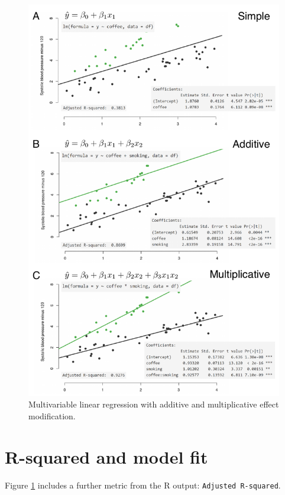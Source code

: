 \documentclass[12pt,]{krantz}
\theoremstyle{definition}
\theoremstyle{definition}
\theoremstyle{definition}
\theoremstyle{remark}
\begin{document}
\begin{figure}
\centering
\includegraphics{images/chapter07/6_types.pdf}
\caption{\label{fig:chap07-fig-types}Multivariable linear regression with
additive and multiplicative effect modification.}
\end{figure}

\hypertarget{r-squared-and-model-fit}{%
\section{R-squared and model fit}\label{r-squared-and-model-fit}}

Figure \ref{fig:chap07-fig-types} includes a further metric from the R
output: \texttt{Adjusted\ R-squared}.
\end{document}

